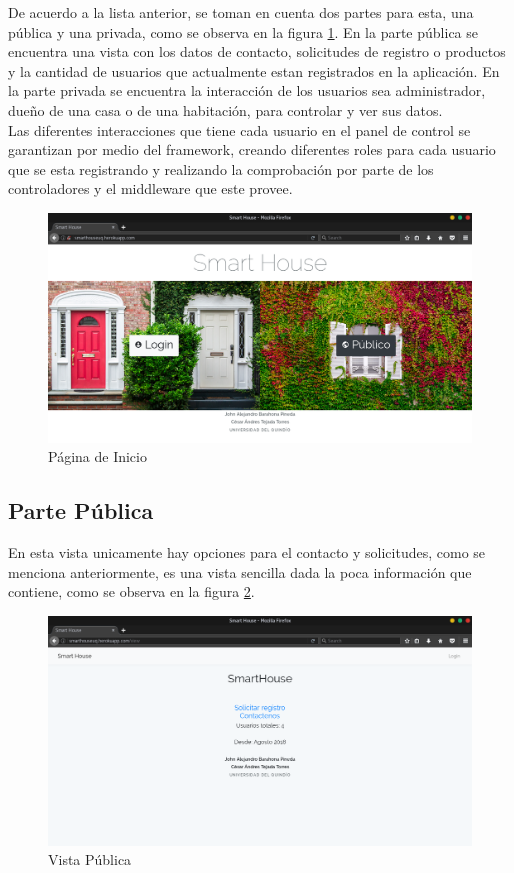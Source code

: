 De acuerdo a la lista anterior, se toman en cuenta dos partes para esta, una pública y una privada, como se observa en la figura \ref{fig:index}. En la parte pública se encuentra una vista con los datos de contacto, solicitudes de registro o productos y la cantidad de usuarios que actualmente estan registrados en la aplicación. En la parte privada se encuentra la interacción de los usuarios sea administrador, dueño de una casa o de una habitación, para controlar y ver sus datos.\\

Las diferentes interacciones que tiene cada usuario en el panel de control se garantizan por medio del framework, creando diferentes roles para cada usuario que se esta registrando y realizando la comprobación por parte de los controladores y el middleware que este provee.\\

\begin{figure}[H]
\centering
\caption{Página de Inicio}
\label{fig:index}
\includegraphics[width=0.5\linewidth]{Imagenes/Index}
\end{figure}

\subsection{Parte Pública}

En esta vista unicamente hay opciones para el contacto y solicitudes, como se menciona anteriormente, es una vista sencilla dada la poca información que contiene, como se observa en la figura \ref{fig:publicview}.

\begin{figure}[H]
\centering
\caption{Vista Pública}
\label{fig:publicview}
\includegraphics[width=0.5\linewidth]{Imagenes/Public_view}
\end{figure}

